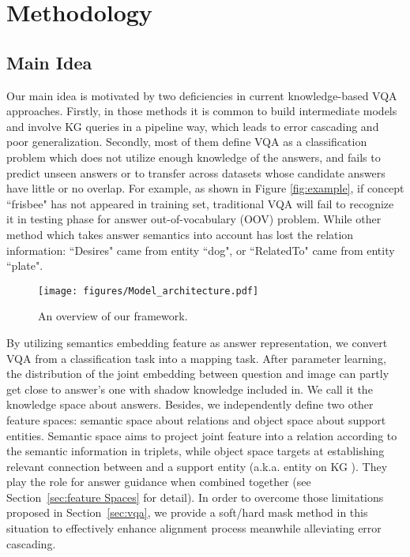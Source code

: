 \documentclass[runningheads]{llncs}
\begin{document}
\section{Methodology}
\subsection{Main Idea}
Our main idea is motivated by two deficiencies in current knowledge-based VQA approaches. Firstly, in those methods it is common to build intermediate models and involve KG queries in a pipeline way, which leads to error cascading and poor generalization.
Secondly, most of them define VQA as a classification problem which does not utilize enough knowledge of the answers, and fails to predict unseen answers or to transfer across datasets whose candidate answers have little or no overlap.
For example, as shown in Figure \ref{fig:example}, if concept ``frisbee" has not appeared in training set, traditional VQA will fail to recognize it in testing phase for answer out-of-vocabulary (OOV) problem. While other method \cite{DBLP:conf/cvpr/HuCS18} which takes answer semantics into account has lost the relation information: ``Desires" came from entity ``dog", or ``RelatedTo" came from entity ``plate".
\begin{figure}[htbp]
\centering
\texttt{[image: figures/Model\_architecture.pdf]} 
\caption{ An overview of our framework.
}
\label{fig:Model_architecture}
\end{figure}

By utilizing semantics embedding feature as answer representation, we convert VQA from a classification task into a mapping task. After parameter learning, the distribution of the joint embedding between question and image can partly get close to answer's one  with shadow knowledge included in. We call it the knowledge space about answers.
Besides, we independently define two other feature spaces: semantic space about relations and object space about support entities.
Semantic space aims to project  joint feature into a relation according to the semantic information in triplets, while object space targets at establishing relevant connection between   and a support entity (a.k.a. entity on KG ).
They play the role for answer guidance when combined together (see Section~\ref{sec:feature Spaces} for detail).
In order to overcome those limitations proposed in Section~\ref{sec:vqa}, we provide a soft/hard mask method in this situation to effectively enhance alignment process meanwhile alleviating error cascading.
\end{document}
